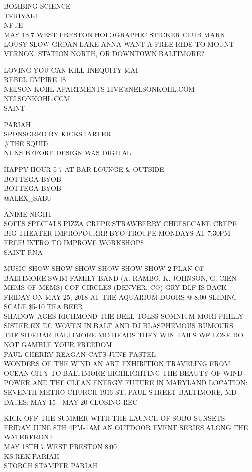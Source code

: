 \documentclass[10pt,letterpaper]{article}
\begin{document}
BOMBING SCIENCE\\
TERIYAKI\\
NFTE\\
MAY 18 7 WEST PRESTON HOLOGRAPHIC STICKER CLUB MARK LOUSY SLOW GROAN LAKE ANNA WANT A FREE RIDE TO MOUNT VERNON, STATION NORTH, OR DOWNTOWN BALTIMORE?

LOVING YOU CAN KILL INEQUITY MAI\\
REBEL EMPIRE 18\\
NELSON KOHL APARTMENTS LIVE@NELSONKOHL.COM | NELSONKOHL.COM\\
SAINT

PARIAH\\
SPONSORED BY KICKSTARTER\\
\#THE SQUID\\
NUNS BEFORE DESIGN WAS DIGITAL

HAPPY HOUR 5 7 AT BAR LOUNGE \& OUTSIDE\\
BOTTEGA BYOB\\
BOTTEGA BYOB\\
@ALEX\_SABU

ANIME NIGHT\\
SOFI'S SPECIALS PIZZA CREPE STRAWBERRY CHEESECAKE CREPE\\
BIG THEATER IMPROPOURRI! BYO TROUPE MONDAYS AT 7:30PM FREE! INTRO TO IMPROVE WORKSHOPS\\
SAINT RNA

MUSIC SHOW SHOW SHOW SHOW SHOW SHOW 2 PLAN OF BALTIMORE SWIM FAMILY BAND (A. RAMBO, K. JOHNSON, G. CIEN MEMS OF MEMS) COP CIRCLES (DENVER, CO) GRY DLF IS BACK FRIDAY ON MAY 25, 2018 AT THE AQUARIUM DOORS @ 8:00 SLIDING SCALE \$5{-}10 TEA BEER\\
SHADOW AGES RICHMOND THE BELL TOLSS SOMNIUM MORI PHILLY SISTER EX DC WOVEN IN BALT AND DJ BLASPHEMOUS RUMOURS THE SIDEBAR BALTIMORE MD HEADS THEY WIN TAILS WE LOSE DO NOT GAMBLE YOUR FREEDOM\\
PAUL CHERRY REAGAN CATS JUNE PASTEL\\
WONDERS OF THE WIND AN ART EXHIBITION TRAVELING FROM OCEAN CITY TO BALTIMORE HIGHLIGHTING THE BEAUTY OF WIND POWER AND THE CLEAN ENERGY FUTURE IN MARYLAND LOCATION: SEVENTH METRO CHURCH 1916 ST. PAUL STREET BALTIMORE, MD DATES: MAY 15 {-} MAY 20 CLOSING REC

KICK OFF THE SUMMER WITH THE LAUNCH OF SOBO SUNSETS FRIDAY JUNE 8TH 4PM{-}1AM AN OUTDOOR EVENT SERIES ALONG THE WATERFRONT\\
MAY 18TH 7 WEST PRESTON 8:00\\
KS REK PARIAH\\
STORCH STAMPER PARIAH
\end{document}
